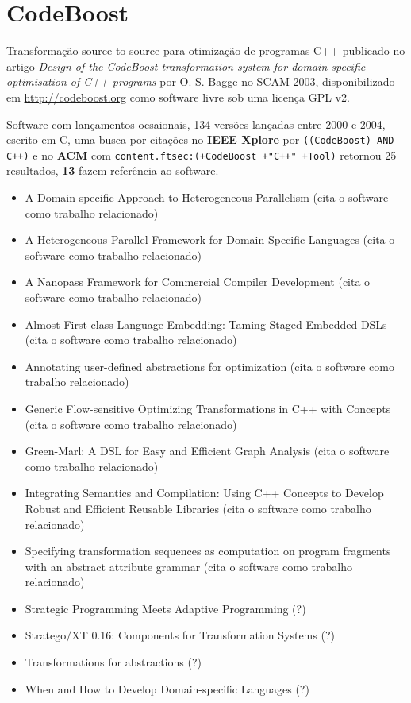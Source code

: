 \section{CodeBoost}

Transformação source-to-source para otimização de programas C++
publicado no artigo {\it Design of the CodeBoost transformation system for domain-specific optimisation of C++ programs}
por O. S. Bagge
no SCAM 2003,
disponibilizado em \url{http://codeboost.org}
como software livre
sob uma licença GPL v2.

Software com lançamentos ocsaionais,
134 versões lançadas
entre 2000 e 2004,
escrito em C,
uma busca por citações no {\bf IEEE Xplore} por
\texttt{((CodeBoost) AND C++)}
e no {\bf ACM} com
\texttt{content.ftsec:(+CodeBoost +"C++" +Tool)}
retornou
25 resultados,
{\bf 13} fazem referência ao software.

\begin{itemize}
\item A Domain-specific Approach to Heterogeneous Parallelism (cita o software como trabalho relacionado)
\item A Heterogeneous Parallel Framework for Domain-Specific Languages (cita o software como trabalho relacionado)
\item A Nanopass Framework for Commercial Compiler Development (cita o software como trabalho relacionado)
\item Almost First-class Language Embedding: Taming Staged Embedded DSLs (cita o software como trabalho relacionado)
\item Annotating user-defined abstractions for optimization (cita o software como trabalho relacionado)
\item Generic Flow-sensitive Optimizing Transformations in C++ with Concepts (cita o software como trabalho relacionado)
\item Green-Marl: A DSL for Easy and Efficient Graph Analysis (cita o software como trabalho relacionado)
\item Integrating Semantics and Compilation: Using C++ Concepts to Develop Robust and Efficient Reusable Libraries (cita o software como trabalho relacionado)
\item Specifying transformation sequences as computation on program fragments with an abstract attribute grammar (cita o software como trabalho relacionado)
\item Strategic Programming Meets Adaptive Programming (?)
\item Stratego/XT 0.16: Components for Transformation Systems (?)
\item Transformations for abstractions (?)
\item When and How to Develop Domain-specific Languages (?)
\end{itemize}

